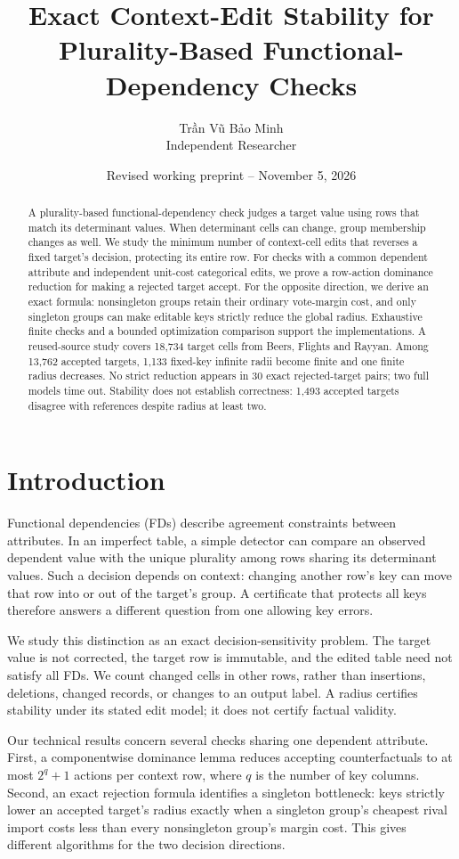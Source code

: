 \documentclass[11pt]{article}
\title{Exact Context-Edit Stability for\\Plurality-Based Functional-Dependency Checks}
\author{Trần Vũ Bảo Minh\\[0.4em]\small Independent Researcher}
\date{Revised working preprint -- November 5, 2026}
\begin{document}
\maketitle
\begin{abstract}
A plurality-based functional-dependency check judges a target value using rows
that match its determinant values. When determinant cells can change, group
membership changes as well. We study the minimum number of context-cell edits
that reverses a fixed target's decision, protecting its entire row. For checks
with a common dependent attribute and independent unit-cost categorical edits,
we prove a row-action dominance reduction for making a rejected target accept.
For the opposite direction, we derive an exact formula: nonsingleton groups
retain their ordinary vote-margin cost, and only singleton groups can make
editable keys strictly reduce the global radius. Exhaustive finite checks and a
bounded optimization comparison support the implementations. A reused-source
study covers 18,734 target cells from Beers, Flights and Rayyan. Among 13,762
accepted targets, 1,133 fixed-key infinite radii become finite and one finite
radius decreases. No strict reduction appears in 30 exact rejected-target
pairs; two full models time out. Stability does not establish correctness:
1,493 accepted targets disagree with references despite radius at least two.
\end{abstract}

\section{Introduction}
Functional dependencies (FDs) describe agreement constraints between attributes.
In an imperfect table, a simple detector can compare an observed dependent
value with the unique plurality among rows sharing its determinant values.
Such a decision depends on context: changing another row's key can move that
row into or out of the target's group. A certificate that protects all keys
therefore answers a different question from one allowing key errors.

We study this distinction as an exact decision-sensitivity problem. The target
value is not corrected, the target row is immutable, and the edited table need
not satisfy all FDs. We count changed cells in other rows, rather than insertions,
deletions, changed records, or changes to an output label. A radius certifies
stability under its stated edit model; it does not certify factual validity.

Our technical results concern several checks sharing one dependent attribute.
First, a componentwise dominance lemma reduces accepting counterfactuals to
at most $2^q+1$ actions per context row, where $q$ is the number of key columns.
Second, an exact rejection formula identifies a singleton bottleneck: keys
strictly lower an accepted target's radius exactly when a singleton group's
cheapest rival import costs less than every nonsingleton group's margin cost.
This gives different algorithms for the two decision directions.
\end{document}
